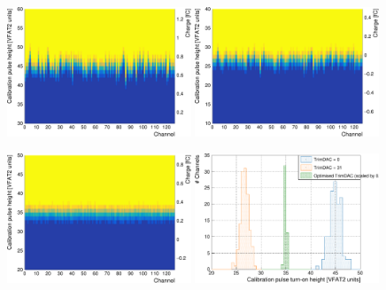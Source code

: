       \begin{figure}[h!]
        \centering
        \includegraphics[width=0.49\textwidth]{img/plots/cSCurve_ChannelVCal_Trim0-crop}
        \includegraphics[width=0.49\textwidth]{img/plots/cSCurve_ChannelVCal_Trim1-crop}
        \caption{}
        \label{fig:II-5-qualification-trim}
      \end{figure}

      \begin{figure}[h!]
        \centering
        \includegraphics[width=0.49\textwidth]{img/plots/cSCurve_ChannelVCal_Trimed-crop}
        \includegraphics[width=0.49\textwidth]{img/plots/cSCurve_ChannelVCal_Disp-crop}
        \caption{}
        \label{fig:II-5-qualification-trimed}
      \end{figure}



